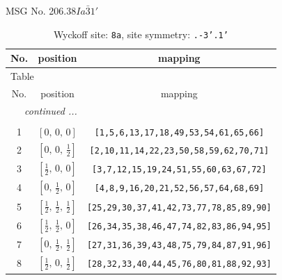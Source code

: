 \documentclass[fleqn,8pt]{jsarticle}
\begin{document}
\setcounter{MaxMatrixCols}{32}

\renewcommand{\tablename}{Table~}
\renewcommand{\figurename}{Figure~}
\begin{center}
\LARGE
MSG No. 206.38\quad$Ia\bar{3}1'$
\end{center}
\renewcommand{\arraystretch}{1.2}
\begin{longtable}{ccc}
\caption{Wyckoff site: {\tt 8a}, site symmetry: {\tt .-3'.1'}}
 \\
 \hline \hline
No. & position & mapping \\ \hline \endfirsthead

\multicolumn{2}{l}{\tablename\ \thetable{}} \\
 \hline \hline
No. & position & mapping \\ \hline \endhead

 \hline \hline
\multicolumn{2}{r}{\footnotesize\it continued ...} \\ \endfoot

 \hline \hline
\multicolumn{2}{r}{} \\ \endlastfoot

1 & $\left[ 0,\, 0,\, 0 \right]$ & {\tt [1,5,6,13,17,18,49,53,54,61,65,66]} \\ \hline
2 & $\left[ 0,\, 0,\, \frac{1}{2} \right]$ & {\tt [2,10,11,14,22,23,50,58,59,62,70,71]} \\ \hline
3 & $\left[ \frac{1}{2},\, 0,\, 0 \right]$ & {\tt [3,7,12,15,19,24,51,55,60,63,67,72]} \\ \hline
4 & $\left[ 0,\, \frac{1}{2},\, 0 \right]$ & {\tt [4,8,9,16,20,21,52,56,57,64,68,69]} \\ \hline
5 & $\left[ \frac{1}{2},\, \frac{1}{2},\, \frac{1}{2} \right]$ & {\tt [25,29,30,37,41,42,73,77,78,85,89,90]} \\ \hline
6 & $\left[ \frac{1}{2},\, \frac{1}{2},\, 0 \right]$ & {\tt [26,34,35,38,46,47,74,82,83,86,94,95]} \\ \hline
7 & $\left[ 0,\, \frac{1}{2},\, \frac{1}{2} \right]$ & {\tt [27,31,36,39,43,48,75,79,84,87,91,96]} \\ \hline
8 & $\left[ \frac{1}{2},\, 0,\, \frac{1}{2} \right]$ & {\tt [28,32,33,40,44,45,76,80,81,88,92,93]} \\
\end{longtable}
\renewcommand{\arraystretch}{1.2}
\end{document}
